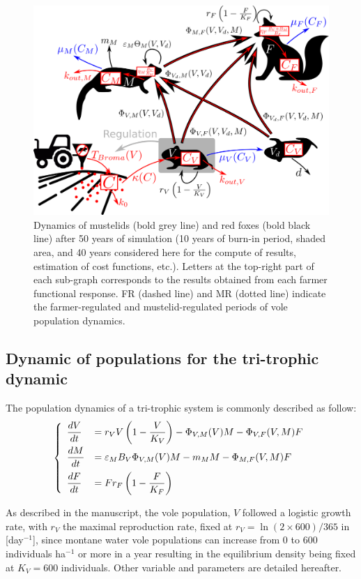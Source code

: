 \documentclass[11pt]{article}
\begin{document}

\begin{figure}[!htb]
	\begin{center}
		\includegraphics[width=.8\linewidth]{img/system_scheme.png}
		\caption{Dynamics of mustelids (bold grey line) and red foxes (bold black line) after 50 years of simulation (10 years of burn-in period, shaded area, and 40 years considered here for the compute of results, estimation of 
			cost functions, etc.). Letters at the top-right part of each sub-graph corresponds to the results obtained from each farmer functional response. FR (dashed line) and MR (dotted line) indicate the farmer-regulated and mustelid-regulated periods of vole population dynamics.}
		\label{fig:scheme}
	\end{center}
\end{figure}


\subsection{Dynamic of populations for the tri-trophic dynamic}
%
The population dynamics of a tri-trophic system is commonly described as follow:
\begin{equation}
\left\{
\begin{array}{l l}
\dfrac{dV}{dt} & =  r_V V \left( 1- \dfrac{V}{K_V}\right) - \Phi_{V,M}(V)M - \Phi_{V,F}(V,M)F\\[.3cm]
%
\dfrac{dM}{dt} & = \varepsilon_M B_V \Phi_{V,M}(V)M - m_M M - \Phi_{M,F}(V,M)F\\[.3cm]
%
\dfrac{dF}{dt} & = F r_F \left( 1- \dfrac{F}{K_F}\right)
\end{array}
\right.
\label{eq:simpleSystem}
\end{equation}

As described in the manuscript, the vole population, $V$ followed a logistic growth rate, with $r_V$  the maximal reproduction rate, fixed at $r_V = \ln(2 \times 600)/365$ in [day$^{-1}$], since montane water vole populations can increase from 0  to  600 individuals ha$^{-1}$ or more in a year \citep{Giraudoux1997} resulting in the equilibrium density being fixed at $K_V = 600$ individuals.
%
Other variable and parameters are detailed hereafter.
\end{document}

